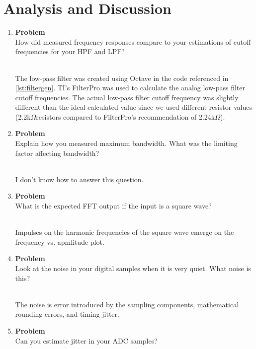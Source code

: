 \documentclass[12pt]{article}
\newenvironment{Ex}{\textbf{Problem}\vspace{.25em}\\}{}
\newcommand{\ohm}{$\Omega$}
\newcommand{\hbr}{\hfill\vspace{.25em}\\}
\begin{document}
\section{Analysis and Discussion}
\begin{enumerate}[1)]
\item
  \begin{Ex}
    How did measured frequency responses compare to your estimations
    of cutoff frequencies for your HPF and LPF?
    \begin{solution} \hbr
      The low-pass filter was created using Octave in the code
      referenced in \cref{lst:filtergen}. TI's FilterPro was used to
      calculate the analog low-pass filter cutoff frequencies. The
      actual low-pass filter cutoff frequency was slightly different
      than the ideal calculated value since we used different resistor
      values (2.2k\ohm resistors compared to FilterPro's recommendation
      of 2.24k\ohm).
    \end{solution}
  \end{Ex}
\item
  \begin{Ex}
    Explain how you measured maximum bandwidth. What was the
    limiting factor affecting bandwidth?
    \begin{solution} \hbr
      I don't know how to answer this question.
    \end{solution}
  \end{Ex}
\item
  \begin{Ex}
    What is the expected FFT output if the input is a square wave?
    \begin{solution} \hbr
      Impulses on the harmonic frequencies of the square wave emerge on
      the frequency vs. apmlitude plot.
    \end{solution}
  \end{Ex}
\item
  \begin{Ex}
    Look at the noise in your digital samples when it is very
    quiet. What noise is this?
    \begin{solution} \hbr
      The noise is error introduced by the sampling components,
      mathematical rounding errors, and timing jitter.
    \end{solution}
  \end{Ex}
\item
  \begin{Ex}
    Can you estimate jitter in your ADC samples?
    \begin{solution} \hbr

\end{solution}
\end{Ex}
\end{enumerate}
\end{document}
